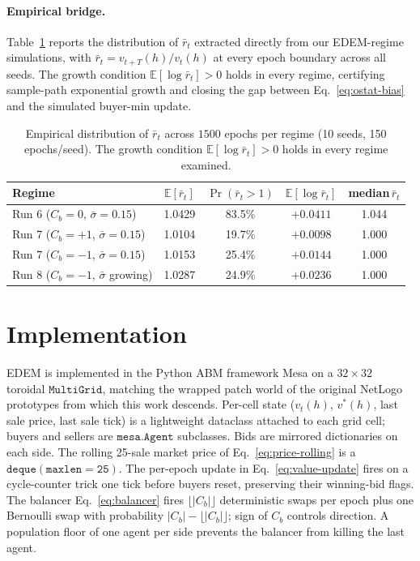 \documentclass{article}
\begin{document}
\paragraph{Empirical bridge.}
Table~\ref{tab:rbar} reports the distribution of $\bar r_t$
extracted directly from our EDEM-regime simulations, with
$\bar r_t = v_{t+T}(h)/v_t(h)$ at every epoch boundary across all
seeds. The growth condition $\mathbb{E}[\log \bar r_t] > 0$ holds
in every regime, certifying sample-path exponential growth and
closing the gap between Eq.~\eqref{eq:ostat-bias} and the simulated
buyer-min update.

\begin{table}[h]
\centering
\caption{Empirical distribution of $\bar r_t$ across $1500$ epochs
per regime (10 seeds, 150 epochs/seed). The growth condition
$\mathbb{E}[\log \bar r_t] > 0$ holds in every regime examined.}
\label{tab:rbar}
\small
\begin{tabular}{l c c c c}
\toprule
\textbf{Regime} & $\mathbb{E}[\bar r_t]$ & $\Pr(\bar r_t>1)$ & $\mathbb{E}[\log \bar r_t]$ & median$\,\bar r_t$ \\
\midrule
Run 6 ($C_b=0$, $\bar\sigma=0.15$)        & 1.0429 & 83.5\% & $+0.0411$ & 1.044 \\
Run 7 ($C_b=+1$, $\bar\sigma=0.15$)       & 1.0104 & 19.7\% & $+0.0098$ & 1.000 \\
Run 7 ($C_b=-1$, $\bar\sigma=0.15$)       & 1.0153 & 25.4\% & $+0.0144$ & 1.000 \\
Run 8 ($C_b=-1$, $\bar\sigma$ growing)    & 1.0287 & 24.9\% & $+0.0236$ & 1.000 \\
\bottomrule
\end{tabular}
\end{table}

\section{Implementation}
\label{sec:implementation}

EDEM is implemented in the Python ABM framework Mesa
\citep{masad2015mesa} on a $32 \times 32$ toroidal
$\mathtt{MultiGrid}$, matching the wrapped patch world of the
original NetLogo prototypes \citep{wilensky1999} from which this
work descends. Per-cell
state ($v_t(h)$, $v^*(h)$, last sale price, last sale tick) is a
lightweight dataclass attached to each grid cell; buyers and sellers
are $\mathtt{mesa.Agent}$ subclasses. Bids are mirrored
dictionaries on each side. The rolling 25-sale market price of
Eq.~\eqref{eq:price-rolling} is a $\mathtt{deque(maxlen=25)}$. The
per-epoch update in Eq.~\eqref{eq:value-update} fires on a
cycle-counter trick one tick before buyers reset, preserving their
winning-bid flags. The balancer Eq.~\eqref{eq:balancer} fires
$\lfloor |C_b| \rfloor$ deterministic swaps per epoch plus one
Bernoulli swap with probability $|C_b| - \lfloor |C_b| \rfloor$;
sign of $C_b$ controls direction. A population floor of one agent
per side prevents the balancer from killing the last agent.
\end{document}
